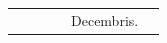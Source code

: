 \documentclass[11pt,openany]{book}
\renewcommand{\\}{\par\hspace*{1em}} %
\begin{document}
\begin{center}
\begin{tabular}{l | l | l | r | l l}
& & & & \color{Red} Decembris. \\

\end{tabular}
\end{center}
\end{document}
